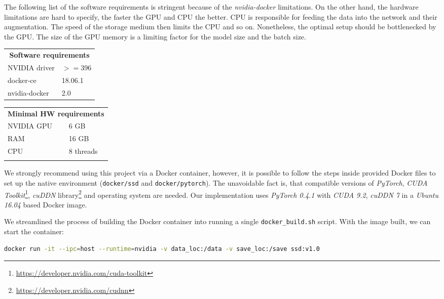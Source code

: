 The following list of the software requirements is stringent because of the \textit{nvidia-docker} limitations. On the other hand, the hardware limitations are hard to specify, the faster the GPU and CPU the better. CPU is responsible for feeding the data into the network and their augmentation. The speed of the storage medium then limits the CPU and so on. Nonetheless, the optimal setup should be bottlenecked by the GPU. The size of the GPU memory is a limiting factor for the model size and the batch size.

\begin{multicols}{2}
\begin{tabular}{l l}
    \multicolumn{2}{c}{\textbf{Software requirements}} \\
    NVIDIA driver & $>=$396\\
    docker-ce & 18.06.1 \\
    nvidia-docker & 2.0 \\
\end{tabular}

\begin{tabular}{l l}
    \multicolumn{2}{c}{\textbf{Minimal HW requirements}} \\
    NVIDIA GPU & 6 GB  \\
    RAM & 16 GB\\
    CPU & 8 threads \\
     \\
\end{tabular}
\end{multicols}

We strongly recommend using this project via a Docker container, however, it is possible to follow the steps inside provided Docker files to set up the native environment ({\tt docker/ssd} and {\tt docker/pytorch}). The unavoidable fact is, that compatible versions of \textit{PyTorch}, \textit{CUDA Toolkit}\footnote{\url{https://developer.nvidia.com/cuda-toolkit}}, \textit{cuDDN} library\footnote{\url{https://developer.nvidia.com/cudnn}} and operating system are needed. Our implementation uses \textit{PyTorch 0.4.1} with \textit{CUDA 9.2}, \textit{cuDDN 7} in a \textit{Ubuntu 16.04} based Docker image.

We streamlined the process of building the Docker container into running a single {\tt docker\_build.sh} script. With the image built, we can start the container:

\begin{lstlisting}[breaklines, frame=single, language=Bash, basicstyle=\ttfamily]
  docker run -it --ipc=host --runtime=nvidia -v data_loc:/data -v save_loc:/save ssd:v1.0
\end{lstlisting}

